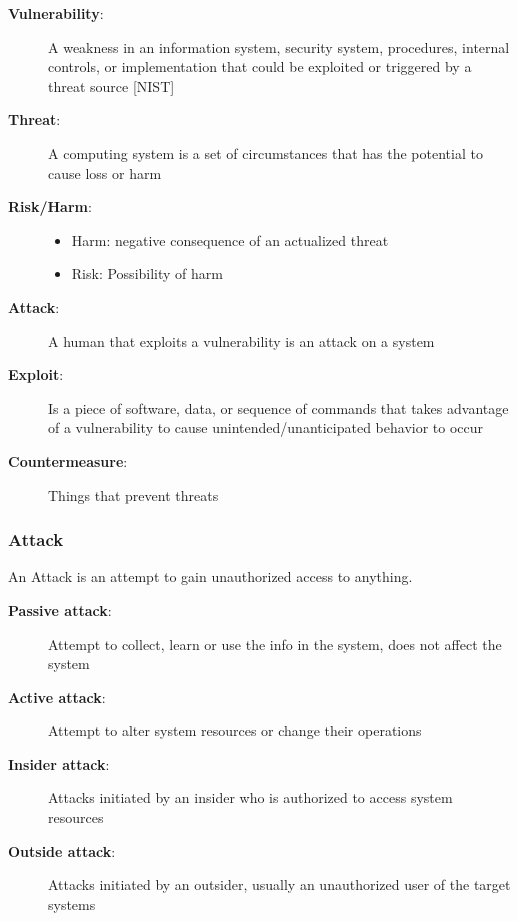 \documentclass[11pt,a4paper]{article}
\begin{document}
\begin{description}
    \item[\textbf{Vulnerability}:] A weakness in an information system, security system, procedures, internal controls, or implementation that could be exploited or triggered by a threat source [NIST]
    
    \item[\textbf{Threat}:] A computing system is a set of circumstances that has the potential to cause loss or harm
    
    \item[\textbf{Risk/Harm}:]
    \begin{itemize}
        \item Harm: negative consequence of an actualized threat
        \item Risk: Possibility of harm
    \end{itemize}
    
    \item[\textbf{Attack}:] A human that exploits a vulnerability is an attack on a system
    
    \item[\textbf{Exploit}:] Is a piece of software, data, or sequence of commands that takes advantage of a vulnerability to cause unintended/unanticipated behavior to occur
    
    \item[\textbf{Countermeasure}:] Things that prevent threats
\end{description}

\subsubsection{Attack}
An Attack is an attempt to gain unauthorized access to anything.

\begin{description}
    \item[\textbf{Passive attack}:] Attempt to collect, learn or use the info in the system, does not affect the system
    
    \item[\textbf{Active attack}:] Attempt to alter system resources or change their operations
    
    \item[\textbf{Insider attack}:] Attacks initiated by an insider who is authorized to access system resources
    
    \item[\textbf{Outside attack}:] Attacks initiated by an outsider, usually an unauthorized user of the target systems
\end{description}
\end{document}
